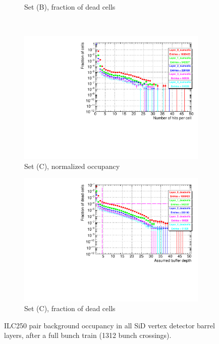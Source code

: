 \begin{figure}[htb]
\begin{subfigure}[b]{0.49\textwidth}
    \caption{Set (B), fraction of dead cells}
   \end{subfigure}\\
     \begin{subfigure}[b]{0.49\textwidth}
   \centering
    \includegraphics[width=\textwidth]{Figures/Pairs/Appendix/occupancy_numcells_SiVertexBarrel_ILC250_SetC_corrected_Barrel_size.pdf}
   \caption{Set (C), normalized occupancy}
   \end{subfigure}
   \hfill
    \begin{subfigure}[b]{0.49\textwidth}
   \centering
   \includegraphics[width=\textwidth]{Figures/Pairs/Appendix/occupancy_deadcells_SiVertexBarrel_ILC250_SetC_corrected_Barrel_size.pdf}
   \caption{Set (C), fraction of dead cells}
   \end{subfigure}
   \caption[Pair background occupancy in all SiD vertex detector barrel layers for the ILC250]{ILC250 pair background occupancy in all SiD vertex detector barrel layers, after a full bunch train (1312 bunch crossings).
}
\end{figure}
